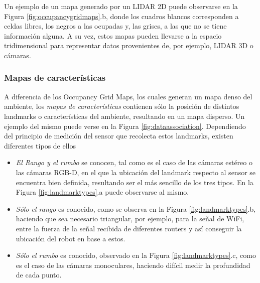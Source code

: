 Un ejemplo de un mapa generado por un LIDAR 2D puede observarse en la Figura \ref{fig:occupancygridmaps}.b, donde los cuadros blancos corresponden a celdas libres, los negros a las ocupadas y, las grises, a las que no se tiene información alguna. A su vez, estos mapas pueden llevarse a la espacio tridimensional para representar datos provenientes de, por ejemplo, LIDAR 3D o cámaras.

\subsubsection{Mapas de características}
A diferencia de los Occupancy Grid Maps, los cuales generan un mapa denso del ambiente, los \textit{mapas de características} contienen sólo la posición de distintos landmarks o características del ambiente, resultando en un mapa disperso. Un ejemplo del mismo puede verse en la Figura \ref{fig:dataassociation}.
Dependiendo del principio de medición del sensor que recolecta estos landmarks, existen diferentes tipos de ellos
\begin{itemize}
    \item \textit{El Rango y el rumbo} se conocen, tal como es el caso de las cámaras estéreo o las cámaras RGB-D, en el que la ubicación del landmark respecto al sensor se encuentra bien definida, resultando ser el más sencillo de los tres tipos. En la Figura \ref{fig:landmarktypes}.a puede observarse al mismo.
    \item \textit{Sólo el rango} es conocido, como se observa en la Figura \ref{fig:landmarktypes}.b, haciendo que sea necesario triangular, por ejemplo, para la señal de WiFi, entre la fuerza de la señal recibida de diferentes routers y así conseguir la ubicación del robot en base a estos.
    \item \textit{Sólo el rumbo} es conocido, observado en la Figura \ref{fig:landmarktypes}.c, como es el caso de las cámaras monoculares, haciendo difícil medir la profundidad de cada punto.
\end{itemize}

